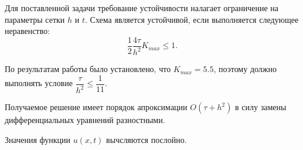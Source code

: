 \documentclass[a4paper,12pt]{report}
\begin{document}
Для поставленной задачи требование устойчивости налагает ограничение на параметры сетки $h$ и $t$.
Схема является устойчивой, если выполняется следующее неравенство:
\begin{equation}
	\dfrac{1}{2} \dfrac{4\tau}{h^{2}}K_{max} \le 1.
\end{equation}

По результатам работы было установлено, что $K_{max}  = 5.5$, поэтому должно выполнять условие $\dfrac{\tau}{h^{2}} \le \dfrac{1}{11}$.

Получаемое решение имеет порядок апроксимации $O(\tau + h^{2})$ в силу замены 
дифференциальных уравнений разностными.

Значения функции $u(x, t)$ вычсляются послойно.
\end{document}
